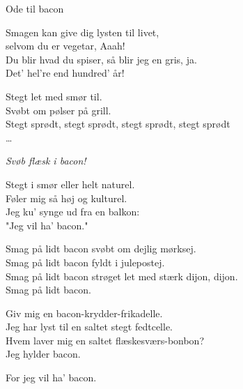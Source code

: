 \begin{song}{Ode til bacon}
  \begin{SBSection*}
    Smagen kan give dig lysten til livet,\\
    selvom du er vegetar, Aaah!\\
    Du blir hvad du spiser, så blir jeg en gris, ja.\\
    Det’ hel’re end hundred’ år!
  \end{SBSection*}

  \begin{SBVerse}
    Stegt let med smør til.\\
    Svøbt om pølser på grill.\\
    Stegt sprødt, stegt sprødt, stegt sprødt, stegt sprødt\\
    \ldots
  \end{SBVerse}

  \begin{SBSection*}
    \emph{Svøb flæsk i bacon!}
  \end{SBSection*}

  \begin{SBSection*}
    Stegt i smør eller helt naturel.\\
    Føler mig så høj og kulturel.\\
    Jeg ku’ synge ud fra en balkon:\\
    "Jeg vil ha’ bacon."
  \end{SBSection*}

  \begin{SBChorus}
    Smag på lidt bacon svøbt om dejlig mørksej.\\
    Smag på lidt bacon fyldt i julepostej.\\
    Smag på lidt bacon strøget let med stærk dijon, dijon.\\
    Smag på lidt bacon.
  \end{SBChorus}

  \begin{SBChorus}
    Giv mig en bacon-krydder-frikadelle.\\
    Jeg har lyst til en saltet stegt fedtcelle.\\
    Hvem laver mig en saltet flæskesværs-bonbon?\\
    Jeg hylder bacon.
  \end{SBChorus}

  \begin{SBSection*}
    For jeg vil ha’ bacon.
  \end{SBSection*}
\end{song}